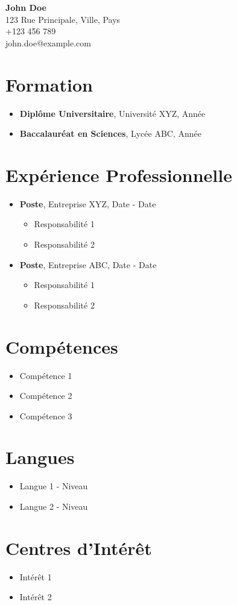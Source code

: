 \documentclass{article}
\makeatletter
\newcommand{\nom}{John Doe}
\newcommand{\adresse}{123 Rue Principale, Ville, Pays}
\newcommand{\telephone}{+123 456 789}
\newcommand{\email}{john.doe@example.com}
\makeatother
\begin{document}
\begin{center}
    \textbf{\LARGE{\nom}} \\
    \adresse \\
    \telephone \\
    \email
\end{center}

\section*{Formation}
\begin{itemize}[leftmargin=*]
    \item \textbf{Diplôme Universitaire}, Université XYZ, Année
    \item \textbf{Baccalauréat en Sciences}, Lycée ABC, Année
\end{itemize}

\section*{Expérience Professionnelle}
\begin{itemize}[leftmargin=*]
    \item \textbf{Poste}, Entreprise XYZ, Date - Date
        \begin{itemize}[leftmargin=*]
            \item Responsabilité 1
            \item Responsabilité 2
        \end{itemize}
    \item \textbf{Poste}, Entreprise ABC, Date - Date
        \begin{itemize}[leftmargin=*]
            \item Responsabilité 1
            \item Responsabilité 2
        \end{itemize}
\end{itemize}

\section*{Compétences}
\begin{itemize}[leftmargin=*]
    \item Compétence 1
    \item Compétence 2
    \item Compétence 3
\end{itemize}

\section*{Langues}
\begin{itemize}[leftmargin=*]
    \item Langue 1 - Niveau
    \item Langue 2 - Niveau
\end{itemize}

\section*{Centres d'Intérêt}
\begin{itemize}[leftmargin=*]
    \item Intérêt 1
    \item Intérêt 2
\end{itemize}
\end{document}
